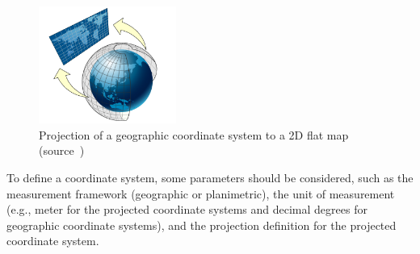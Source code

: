 \documentclass[a4paper,12pt]{article}
\begin{document}
\begin{figure}
\centering
\includegraphics[width=0.4\textwidth]{sphere_to_cylinder}
\caption{Projection of a geographic coordinate system to a 2D flat map (source~\cite{projected})}
\label{figproject}
\end{figure}

To define a coordinate system, some parameters should be considered, such as the measurement framework (geographic  or planimetric), the unit of measurement (e.g., meter for the projected coordinate systems and decimal degrees for geographic coordinate systems), and the projection definition for the projected coordinate system.
\end{document}
